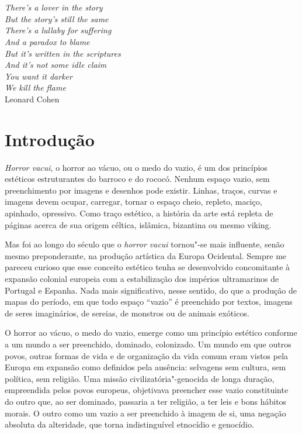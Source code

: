 
\chapter*{}
\thispagestyle{empty}
\begin{vplace}[30]
\begin{flushright}
\emph{There's a lover in the story\\
But the story's still the same\\
There's a lullaby for suffering\\
And a paradox to blame\\
But it's written in the scriptures\\
And it's not some idle claim\\
You want it darker\\
We kill the flame}\\[5pt]
Leonard Cohen 
\end{flushright}
\end{vplace}

\chapter{Introdução}


\emph{Horror vacui}, o horror ao vácuo, ou o medo do vazio, é um dos
princípios estéticos estruturantes do barroco e do rococó. Nenhum espaço
vazio, sem preenchimento por imagens e desenhos pode existir. Linhas,
traços, curvas e imagens devem ocupar, carregar, tornar o espaço cheio,
repleto, maciço, apinhado, opressivo. Como traço estético, a história da
arte está repleta de páginas acerca de sua origem céltica, islâmica,
bizantina ou mesmo viking.

Mas foi ao longo do século  que o \emph{horror vacui} tornou"-se mais
influente, senão mesmo preponderante, na produção artística da Europa
Ocidental. Sempre me pareceu curioso que esse conceito estético tenha se
desenvolvido concomitante à expansão colonial europeia com a
estabilização dos impérios ultramarinos de Portugal e Espanha. Nada mais
significativo, nesse sentido, do que a produção de mapas do período, em
que todo espaço ``vazio'' é preenchido por textos, imagens de seres
imaginários, de sereias, de monstros ou de animais exóticos.

O horror ao vácuo, o medo do vazio, emerge como um princípio estético
conforme a um mundo a ser preenchido, dominado, colonizado. Um mundo em
que outros povos, outras formas de vida e de organização da vida comum
eram vistos pela Europa em expansão como definidos pela ausência:
selvagens sem cultura, sem política, sem religião. Uma missão
civilizatória"-genocida de longa duração, empreendida pelos povos
europeus, objetivava preencher esse vazio constituinte do outro que, ao
ser dominado, passaria a ter religião, a ter leis e bons hábitos morais.
O outro como um vazio a ser preenchido à imagem de si, uma negação
absoluta da alteridade, que torna indistinguível etnocídio e genocídio.

